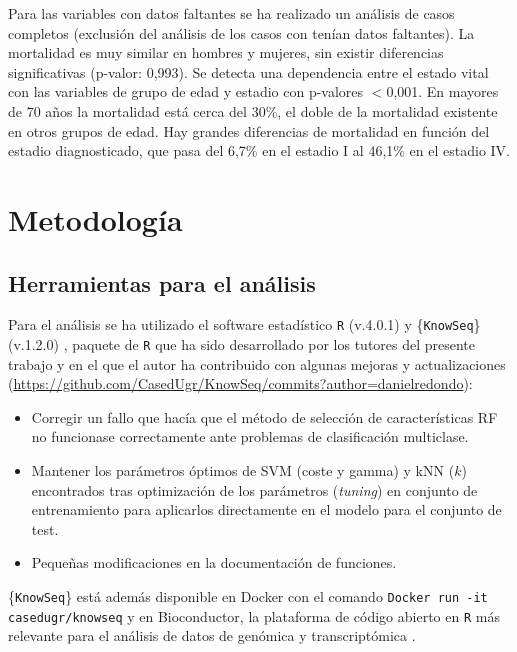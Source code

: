 Para las variables con datos faltantes se ha realizado un análisis de casos completos (exclusión del análisis de los casos con tenían datos faltantes).  La mortalidad es muy similar en hombres y mujeres, sin existir diferencias significativas (p-valor: 0,993). Se detecta una dependencia entre el estado vital con las variables de grupo de edad y estadio con p-valores $<$0,001. En mayores de 70 años la mortalidad está cerca del 30\%, el doble de la mortalidad existente en otros grupos de edad. Hay grandes diferencias de mortalidad en función del estadio diagnosticado, que pasa del 6,7\% en el estadio I al 46,1\% en el estadio IV.

\section{Metodología}

\subsection{Herramientas para el análisis}

Para el análisis se ha utilizado el software estadístico \texttt{R} (v.4.0.1) \cite{R} y \{\texttt{KnowSeq}\} (v.1.2.0) \cite{KnowSeq}, paquete de \texttt{R} que ha sido desarrollado por los tutores del presente trabajo y en el que el autor ha contribuido con algunas mejoras y actualizaciones (\url{https://github.com/CasedUgr/KnowSeq/commits?author=danielredondo}):

\begin{itemize}
	\item Corregir un fallo que hacía que el método de selección de características RF no funcionase correctamente ante problemas de clasificación multiclase.
	\item Mantener los parámetros óptimos de SVM (coste y gamma) y kNN ($k$) encontrados tras optimización de los parámetros (\textit{tuning}) en conjunto de entrenamiento para aplicarlos directamente en el modelo para el conjunto de test.
	\item Pequeñas modificaciones en la documentación de funciones.
\end{itemize}

\{\texttt{KnowSeq}\} está además disponible en Docker con el comando \texttt{Docker run -it casedugr/knowseq} y en Bioconductor, la plataforma de código abierto en \texttt{R} más relevante para el análisis de datos de genómica y transcriptómica \cite{Gentleman2004}.\\

